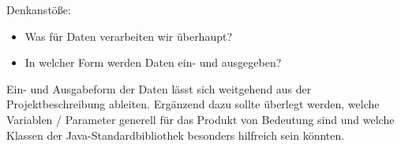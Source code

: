 Denkanstöße:
\begin{itemize}
\item Was für Daten verarbeiten wir überhaupt?
\item In welcher Form werden Daten ein- und ausgegeben?
\end{itemize}
Ein- und Ausgabeform der Daten lässt sich weitgehend aus der Projektbeschreibung ableiten. Ergänzend dazu sollte überlegt werden, welche Variablen / Parameter generell für das Produkt von Bedeutung sind und welche Klassen der Java-Standardbibliothek besonders hilfreich sein könnten.
\nsecend